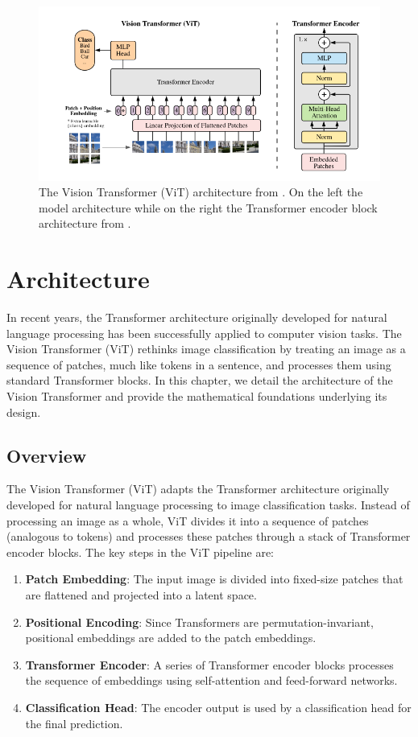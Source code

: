 \begin{figure}[t]
  \center
  \includegraphics[width=1\textwidth]{images/vit-architecture.png}
  \caption{The Vision Transformer (ViT) architecture from \cite{alexey2020image}. On the left the model architecture while on the right the Transformer encoder block architecture from \cite{vaswani2017attention}.}
  \label{fig:vit-architecture}
\end{figure}

\section{Architecture}

In recent years, the Transformer architecture originally developed for natural language processing has been successfully applied to computer vision tasks. The Vision Transformer (ViT) rethinks image classification by treating an image as a sequence of patches, much like tokens in a sentence, and processes them using standard Transformer blocks. In this chapter, we detail the architecture of the Vision Transformer and provide the mathematical foundations underlying its design.

\subsection{Overview}
The Vision Transformer (ViT) adapts the Transformer architecture originally developed for natural language processing to image classification tasks. Instead of processing an image as a whole, ViT divides it into a sequence of patches (analogous to tokens) and processes these patches through a stack of Transformer encoder blocks. The key steps in the ViT pipeline are:

\begin{enumerate}
  \item \textbf{Patch Embedding}: The input image is divided into fixed-size patches that are flattened and projected into a latent space.
  \item \textbf{Positional Encoding}: Since Transformers are permutation-invariant, positional embeddings are added to the patch embeddings.
  \item \textbf{Transformer Encoder}: A series of Transformer encoder blocks processes the sequence of embeddings using self-attention and feed-forward networks.
  \item \textbf{Classification Head}: The encoder output is used by a classification head for the final prediction.
\end{enumerate}

